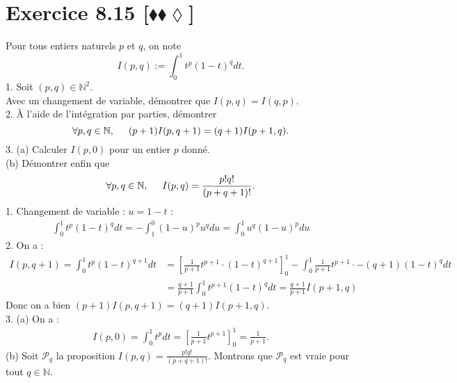 \documentclass[10pt]{article}
\begin{document}

\section*{Exercice 8.15 [$\blacklozenge\blacklozenge\lozenge$]}
\begin{tcolorbox}[enhanced, width=7in, center, size=fbox, fontupper=\large, drop shadow southwest]
    Pour tous entiers naturels $p$ et $q$, on note
    \begin{equation*}
        I(p,q):=\int_0^1{t^p(1-t)^qdt}.
    \end{equation*}
    1. Soit $(p,q)\in\mathbb{N}^2$.\\
    Avec un changement de variable, démontrer que $I(p,q)=I(q,p)$.\\
    2. À l'aide de l'intégration par parties, démontrer
    \begin{equation*}
        \forall{p,q\in\mathbb{N}}, \hspace{0.5cm} (p+1)I(p,q+1)=(q+1)I(p+1,q).
    \end{equation*}
    3. (a) Calculer $I(p,0)$ pour un entier $p$ donné.\\
    (b) Démontrer enfin que
    \begin{equation*}
        \forall{p,q\in\mathbb{N}}, \hspace{0.5cm} I(p,q)=\frac{p!q!}{(p+q+1)!}.
    \end{equation*}
    1. Changement de variable : $u=1-t$ :
    \begin{align*}
        \int^1_0{t^p(1-t)^qdt}=-\int_1^0{(1-u)^pu^qdu}=\int_0^1{u^q(1-u)^pdu}
    \end{align*}
    2. On a :
    \begin{align*}
        I(p,q+1)=\int^1_0{t^p(1-t)^{q+1}dt}&=\left[\frac{1}{p+1}t^{p+1}\cdot(1-t)^{q+1}\right]_0^1-\int_0^1{\frac{1}{p+1}t^{p+1}\cdot-(q+1)(1-t)^{q}dt}\\
        &=\frac{q+1}{p+1}\int_0^1{t^{p+1}(1-t)^{q}dt}=\frac{q+1}{p+1}I(p+1,q)
    \end{align*}
    Donc on a bien $(p+1)I(p,q+1)=(q+1)I(p+1,q)$.\\
    3. (a) On a :
    \begin{align*}
        I(p,0)=\int_0^1{t^pdt}=\left[\frac{1}{p+1}t^{p+1}\right]_0^1=\frac{1}{p+1}.
    \end{align*}
    (b) Soit $\mathcal{P}_q$ la proposition $I(p,q)=\frac{p!q!}{(p+q+1)!}$. Montrons que $\mathcal{P}_q$ est vraie pour tout $q\in\mathbb{N}$.\\

\end{tcolorbox}
\end{document}
